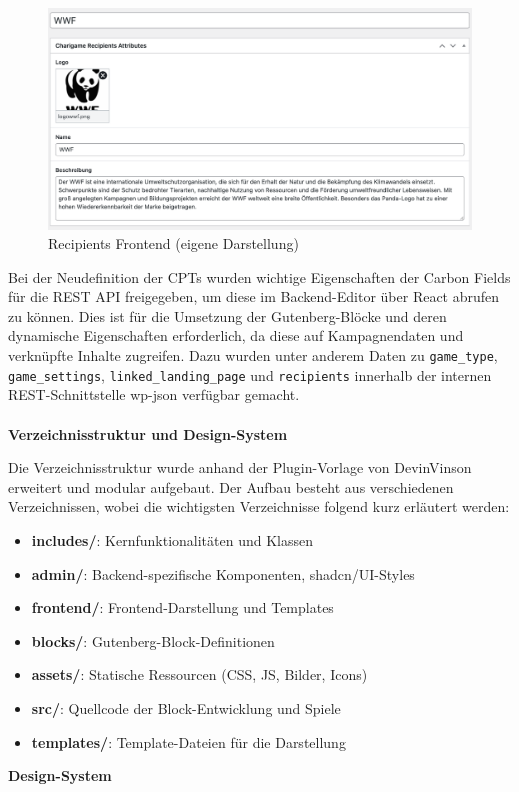 \begin{figure}[H]
    \centering
    \includegraphics[width=1\textwidth]{images/new_recipients_backend}
    \caption{Recipients Frontend (eigene Darstellung)}
    \label{fig:new-recipients-frontend}
\end{figure}

Bei der Neudefinition der CPTs wurden wichtige Eigenschaften der Carbon Fields für die REST API freigegeben, um diese im Backend-Editor über React abrufen zu können.
Dies ist für die Umsetzung der Gutenberg-Blöcke und deren dynamische Eigenschaften erforderlich, da diese auf Kampagnendaten und verknüpfte Inhalte zugreifen.
Dazu wurden unter anderem Daten zu \texttt{game\_type}, \texttt{game\_settings}, \texttt{linked\_landing\_page} und \texttt{recipients} innerhalb der internen REST-Schnittstelle wp-json verfügbar gemacht.
\\\\
\textbf{Verzeichnisstruktur und Design-System}

Die Verzeichnisstruktur wurde anhand der Plugin-Vorlage von DevinVinson erweitert und modular aufgebaut.
Der Aufbau besteht aus verschiedenen Verzeichnissen, wobei die wichtigsten Verzeichnisse folgend kurz erläutert werden:

\begin{itemize}
    \item \textbf{includes/}: Kernfunktionalitäten und Klassen
    \item \textbf{admin/}: Backend-spezifische Komponenten, shadcn/UI-Styles
    \item \textbf{frontend/}: Frontend-Darstellung und Templates
    \item \textbf{blocks/}: Gutenberg-Block-Definitionen
    \item \textbf{assets/}: Statische Ressourcen (CSS, JS, Bilder, Icons)
    \item \textbf{src/}: Quellcode der Block-Entwicklung und Spiele
    \item \textbf{templates/}: Template-Dateien für die Darstellung
\end{itemize}
\vspace{0.5em}
\textbf{Design-System}

